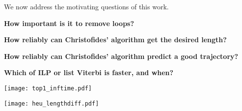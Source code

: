 
We now address the motivating questions of this work.

\textbf{How important is it to remove loops?}

\textbf{How reliably can Christofides' algorithm get the desired length?}

\textbf{How reliably can Christofides' algorithm predict a good trajectory?}

\textbf{Which of ILP or list Viterbi is faster, and when?}



\begin{figure*}[!t]
		\centering
		\texttt{[image: top1\_inftime.pdf]}
	    \label{fig:inftime}
\end{figure*}
\begin{figure*}[!t]
		\centering
		\texttt{[image: heu\_lengthdiff.pdf]}
	    \label{fig:inftime}
\end{figure*}
